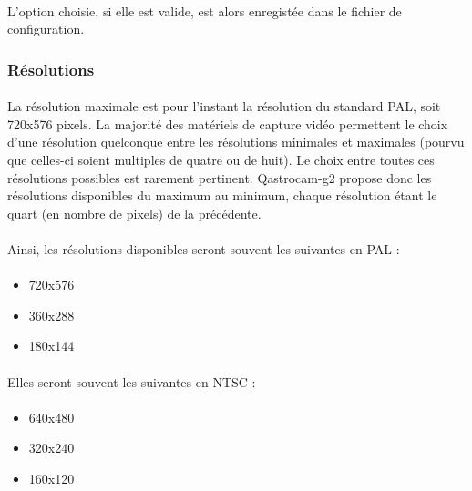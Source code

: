 \documentclass[11pt,a4paper]{book}
\begin{document}
\paragraph*{}
L'option choisie, si elle est valide, est alors enregist\'ee dans le fichier de configuration.

\subsubsection{R\'esolutions}

\paragraph*{}
La r\'esolution maximale est pour l'instant la r\'esolution du standard PAL, soit 720x576 pixels.
La majorit\'e des mat\'eriels de capture vid\'eo permettent le choix d'une r\'esolution quelconque
entre les r\'esolutions minimales et maximales (pourvu que celles-ci soient multiples de quatre ou
de huit). Le choix entre toutes ces r\'esolutions possibles est rarement pertinent. Qastrocam-g2
propose donc les r\'esolutions disponibles du maximum au minimum, chaque r\'esolution \'etant
le quart (en nombre de pixels) de la pr\'ec\'edente.

\paragraph*{}
Ainsi, les r\'esolutions disponibles seront souvent les suivantes en PAL :

\paragraph*{}
\begin{itemize}
\item 720x576
\item 360x288
\item 180x144
\end{itemize}

\paragraph*{}
Elles seront souvent les suivantes en NTSC :

\paragraph*{}
\begin{itemize}
\item 640x480
\item 320x240
\item 160x120
\end{itemize}
\end{document}
